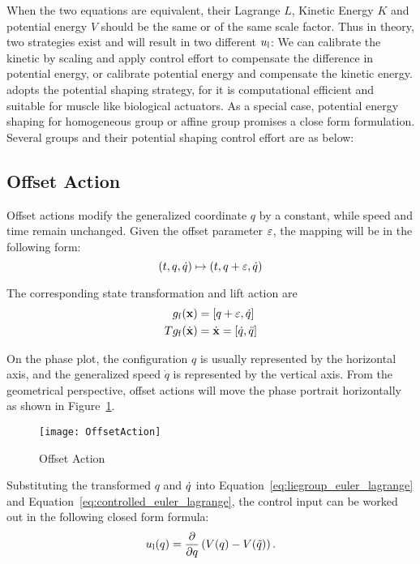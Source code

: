 When the two equations are equivalent, their Lagrange $L$, Kinetic Energy $K$ and potential energy $V$ should be the same or of the same scale factor.
Thus in theory, two strategies exist and will result in two different $u_{\mathrm{l}}$:
We can calibrate the kinetic by scaling and apply control effort to compensate the difference in potential energy, or calibrate potential energy and compensate the kinetic energy.
\moit adopts the potential shaping strategy, for it is computational efficient and suitable for muscle like biological actuators.
As a special case, potential energy shaping for homogeneous group or affine group promises a close form formulation.
Several groups and their potential shaping control effort are as below:



\subsection*{ Offset Action}
Offset actions  modify the generalized coordinate $q$ by a constant, while speed and time remain unchanged.
Given the offset parameter $\varepsilon$, the mapping will be in the following form:
\[
(t,q,\dot{q}) \mapsto (t,q+\varepsilon,\dot{q})
\]

The corresponding state transformation and lift action are
\begin{align}
g_{\mathrm{f}}(\mathbf{x}) &= [q+\varepsilon,\dot{q}] \\
Tg_{\mathrm{f}}(\dot{\mathbf{x}})&=\dot{\mathbf{x}}=[\dot{q},\ddot{q}]
\end{align}


On the phase plot,  the configuration $q$ is usually represented by the horizontal axis, and the generalized speed $\dot{q}$ is represented by the vertical axis.
From the geometrical perspective, offset actions will move the phase portrait horizontally as shown in Figure~\ref{fig:goff}.

\begin{figure}[!htbp]
  \begin{center}
      \texttt{[image: OffsetAction]}
    \caption{Offset Action}
    \label{fig:goff}
\end{center}
\end{figure}

Substituting the transformed $q$ and $\dot{q}$ into Equation~\ref{eq:liegroup_euler_lagrange} and Equation~\ref{eq:controlled_euler_lagrange},
the control input  can be worked out in the following closed form formula:
\begin{equation}
u_{\mathrm{l}}(q) = \frac{\partial}{\partial q} \left(V(q)-V(\tilde{q}) \right).
\end{equation}

